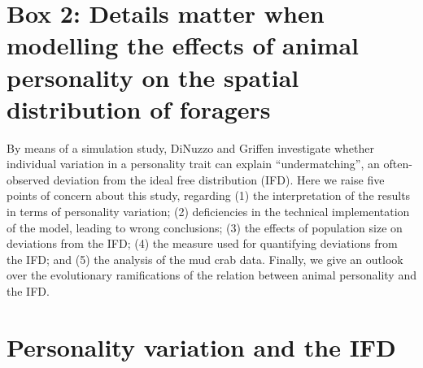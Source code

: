 
\pagestyle{plain}
\pagecolor{Snow2}

	\medskip
	\section*{Box 2: Details matter when modelling the
    effects of animal personality on the
    spatial distribution of foragers}\label{box:details}


	By means of a simulation study, DiNuzzo and Griffen \citep{dinuzzo2020} investigate whether individual variation in a personality trait can explain ``undermatching'', an often-observed deviation from the ideal free distribution (IFD). Here we raise five points of concern about this study, regarding (1) the interpretation of the results in terms of personality variation; (2) deficiencies in the technical implementation of the model, leading to wrong conclusions; (3) the effects of population size on deviations from the IFD; (4) the measure used for quantifying deviations from the IFD; and (5) the analysis of the mud crab data. Finally, we give an outlook over the evolutionary ramifications of the relation between animal personality and the IFD.
	
	\section*{Personality variation and the IFD}
	
